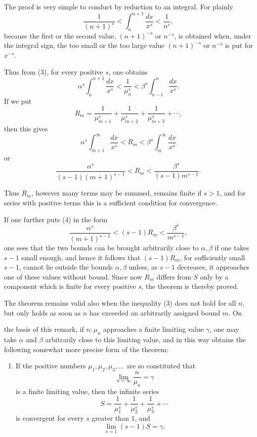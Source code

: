 \documentclass[11pt]{article}
\begin{document}
The proof is very simple to conduct by reduction to an integral. For plainly
\[
\frac1{(n+1)^s}<\int_n^{n+1}\frac{dx}{x^s}<\frac1{n^s},
\]
because the first or the second value, $(n+1)^{-s}$ or $n^{-s}$, is obtained when, under the integral sign, the too small or the too large value $(n+1)^{-s}$ or $n^{-s}$ is put for $x^{-s}$.

Thus from (3), for every positive $s$, one obtains
\[
\alpha^s\int_n^{n+1}\frac{dx}{x^s}<\frac1{\mu_n^s}<\beta^s\int_{n-1}^{n}\frac{dx}{x^s}.
\]
If we put
\[
R_m=\frac1{\mu_{m+1}^s}+\frac1{\mu_{m+2}^s}+\frac1{\mu_{m+3}^s}+\cdots,
\]
then this gives
\[
\alpha^s\int_{m+1}^{\infty}\frac{dx}{x^s}<R_m<\beta^s\int_m^{\infty}\frac{dx}{x^s}
\]
or
\begin{equation}
\frac{\alpha^s}{(s-1)(m+1)^{s-1}}<R_m<\frac{\beta^s}{(s-1)m^{s-1}} .
\tag{4}
\end{equation}

Thus $R_m$, however many terms may be summed, remains finite if $s>1$, and for series with positive terms this is a sufficient condition for convergence.

If one further puts (4) in the form
\[
\frac{\alpha^s}{(m+1)^{s-1}}<(s-1)R_m<\frac{\beta^s}{m^{s-1}},
\]
one sees that the two bounds can be brought arbitrarily close to $\alpha,\beta$ if one takes $s-1$ small enough, and hence it follows that $(s-1)R_m$, for sufficiently small $s-1$, cannot lie outside the bounds $\alpha,\beta$ unless, as $s-1$ decreases, it approaches one of these values without bound. Since now $R_m$ differs from $S$ only by a component which is finite for every positive $s$, the theorem is thereby proved.

The theorem remains valid also when the inequality (3) does not hold for all $n$, but only holds as soon as $n$ has exceeded an arbitrarily assigned bound $m$. On

the basis of this remark, if $n:\mu_n$ approaches a finite limiting value $\gamma$, one may take $\alpha$ and $\beta$ arbitrarily close to this limiting value, and in this way obtains the following somewhat more precise form of the theorem:

\begin{enumerate}[label=\textbf{\arabic*.},leftmargin=2.2em,start=3]
\item If the positive numbers $\mu_1,\mu_2,\mu_3,\ldots$ are so constituted that
\[
\lim_{n=\infty}\frac{n}{\mu_n}=\gamma
\]
is a finite limiting value, then the infinite series
\[
S=\frac1{\mu_1^s}+\frac1{\mu_2^s}+\frac1{\mu_3^s}+\cdots
\]
is convergent for every $s$ greater than $1$, and
\[
\lim_{s=1}(s-1)S=\gamma.
\]
\end{enumerate}
\end{document}
